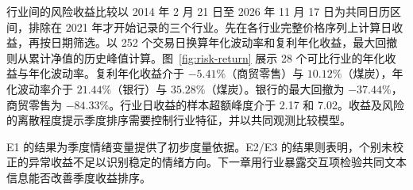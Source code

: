 行业间的风险收益比较以 2014 年 2 月 21 日至 2026 年 11 月 17 日为共同日历区间，排除在 2021 年才开始记录的三个行业。先在各行业完整价格序列上计算日收益，再按日期筛选。以 252 个交易日换算年化波动率和复利年化收益，最大回撤则从累计净值的历史峰值计算。图~\ref{fig:risk-return} 展示 28 个可比行业的年化收益与年化波动率。复利年化收益介于 $-5.41\%$（商贸零售）与 $10.12\%$（煤炭），年化波动率介于 $21.44\%$（银行）与 $35.28\%$（煤炭）。银行的最大回撤为 $-37.44\%$，商贸零售为 $-84.33\%$。行业日收益的样本超额峰度介于 2.17 和 7.02。收益及风险的离散程度提示季度排序需要控制行业特征，并以共同观测比较模型。


E1 的结果为季度情绪变量提供了初步度量依据。E2/E3 的结果则表明，个别未校正的异常收益不足以识别稳定的情绪方向。下一章用行业暴露交互项检验共同文本信息能否改善季度收益排序。
